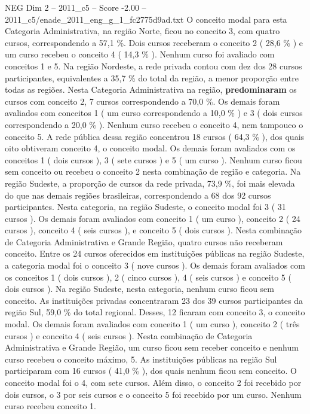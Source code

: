 \begin{textsample}{NEG Dim 2 – 2011\_c5 – Score -2.00 – 2011\_c5/enade\_2011\_eng\_g\_1\_fc2775d9ad.txt}
O conceito modal para esta Categoria Administrativa, na região Norte, ficou no conceito 3, com quatro cursos, correspondendo a 57,1 \%.
Dois cursos receberam o conceito 2 ( 28,6 \% ) e um curso recebeu o conceito 4 ( 14,3 \% ).
Nenhum curso foi avaliado com conceitos 1 e 5.
Na região Nordeste, a rede privada contou com dez dos 28 cursos participantes, equivalentes a 35,7 \% do total da região, a menor proporção entre todas as regiões.
Nesta Categoria Administrativa na região, \textbf{predominaram} os cursos com conceito 2, 7 cursos correspondendo a 70,0 \%.
Os demais foram avaliados com conceitos 1 ( um curso correspondendo a 10,0 \% ) e 3 ( dois cursos correspondendo a 20,0 \% ).
Nenhum curso recebeu o conceito 4, nem tampouco o conceito 5.
A rede pública dessa região concentrou 18 cursos ( 64,3 \% ), dos quais oito obtiveram conceito 4, o conceito modal.
Os demais foram avaliados com os conceitos 1 ( dois cursos ), 3 ( sete cursos ) e 5 ( um curso ).
Nenhum curso ficou sem conceito ou recebeu o conceito 2 nesta combinação de região e categoria.
Na região Sudeste, a proporção de cursos da rede privada, 73,9 \%, foi mais elevada do que nas demais regiões brasileiras, correspondendo a 68 dos 92 cursos participantes.
Nesta categoria, na região Sudeste, o conceito modal foi 3 ( 31 cursos ).
Os demais foram avaliados com conceito 1 ( um curso ), conceito 2 ( 24 cursos ), conceito 4 ( seis cursos ), e conceito 5 ( dois cursos ).
Nesta combinação de Categoria Administrativa e Grande Região, quatro cursos não receberam conceito.
Entre os 24 cursos oferecidos em instituições públicas na região Sudeste, a categoria modal foi o conceito 3 ( nove cursos ).
Os demais foram avaliados com os conceitos 1 ( dois cursos ), 2 ( cinco cursos ), 4 ( seis cursos ) e conceito 5 ( dois cursos ).
Na região Sudeste, nesta categoria, nenhum curso ficou sem conceito.
As instituições privadas concentraram 23 dos 39 cursos participantes da região Sul, 59,0 \% do total regional.
Desses, 12 ficaram com conceito 3, o conceito modal.
Os demais foram avaliados com conceito 1 ( um curso ), conceito 2 ( três cursos ) e conceito 4 ( seis cursos ).
Nesta combinação de Categoria Administrativa e Grande Região, um curso ficou sem receber conceito e nenhum curso recebeu o conceito máximo, 5.
As instituições públicas na região Sul participaram com 16 cursos ( 41,0 \% ), dos quais nenhum ficou sem conceito.
O conceito modal foi o 4, com sete cursos.
Além disso, o conceito 2 foi recebido por dois cursos, o 3 por seis cursos e o conceito 5 foi recebido por um curso.
Nenhum curso recebeu conceito 1.

\end{textsample}
